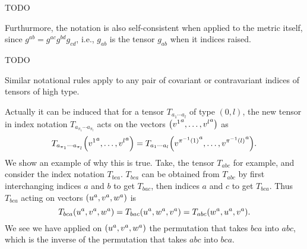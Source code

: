 \documentclass{note}
\numberwithin{equation}{chapter}
\begin{document}
TODO

\begin{quotebar}
    Furthurmore, the notation is also self-consistent when applied to the metric
    itself, since $g^{ab} = g^{ac}g^{bd}g_{cd}$, i.e., $g_{ab}$ is the tensor
    $g_{ab}$ when it indices raised.
\end{quotebar}

TODO

\begin{quotebar}
    Similar notational rules apply to any pair of covariant or contravariant
    indices of tensors of high type.
\end{quotebar}

Actually it can be induced that for a tensor $T_{a_1\cdots a_l}$ of type $(0,
    l)$, the new tensor in index notation $T_{a_{\pi_1}\cdots a_{\pi_l}}$ acts on
the vectors $\prn{{v^1}^a, \dots, {v^l}^a}$ as
\begin{equation*}
    T_{a_{\pi_1}\cdots a_{\pi_l}} \prn{{v^1}^a, \dots, {v^l}^a} = T_{a_1\cdots a_l}
    \prn{{v^{\pi^{-1}(1)}}^a, \dots, {v^{\pi^{-1}(l)}}^a}.
\end{equation*}
We show an example of why this is true. Take, the tensor $T_{abc}$ for example,
and consider the index notation $T_{bca}$. $T_{bca}$ can be obtained from
$T_{abc}$ by first interchanging indices $a$ and $b$ to get $T_{bac}$, then
indices $a$ and $c$ to get $T_{bca}$. Thus $T_{bca}$ acting on vectors
$\prn{u^a, v^a, w^a}$ is
\begin{equation*}
    T_{bca} \prn{u^a, v^a, w^a} = T_{bac} \prn{u^a, w^a, v^a} = T_{abc} \prn{w^a,
        u^a, v^a}.
\end{equation*}
We see we have applied on $\prn{u^a, v^a, w^a}$ the permutation that takes
$bca$ into $abc$, which is the inverse of the permutation that takes $abc$ into
$bca$.
\end{document}
